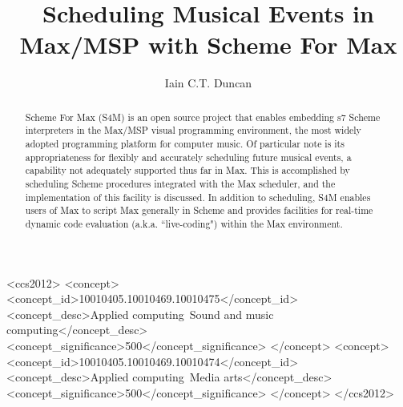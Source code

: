 \documentclass[acmsmall, anonymous, review]{acmart}
\begin{document}
\title{Scheduling Musical Events in Max/MSP with Scheme For Max}

\author{Iain C.T. Duncan}


\renewcommand{\shortauthors}{Duncan}

\begin{abstract}
Scheme For Max (S4M) is an open source project that enables embedding 
s7 Scheme interpreters in the Max/MSP visual programming environment,
the most widely adopted programming platform for computer music.
Of particular note is its appropriateness for flexibly
and accurately scheduling future musical events, a capability not
adequately supported thus far in Max. This is accomplished by scheduling
Scheme procedures integrated with the Max scheduler, and the 
implementation of this facility is discussed.
In addition to scheduling, S4M enables users of Max to script Max 
generally in Scheme and provides facilities for 
real-time dynamic code evaluation (a.k.a. ``live-coding") within the
Max environment. 

\end{abstract}


\begin{CCSXML}
<ccs2012>
<concept>
<concept_id>10010405.10010469.10010475</concept_id>
<concept_desc>Applied computing~Sound and music computing</concept_desc>
<concept_significance>500</concept_significance>
</concept>
<concept>
<concept_id>10010405.10010469.10010474</concept_id>
<concept_desc>Applied computing~Media arts</concept_desc>
<concept_significance>500</concept_significance>
</concept>
</ccs2012>
\end{CCSXML}
\end{document}
